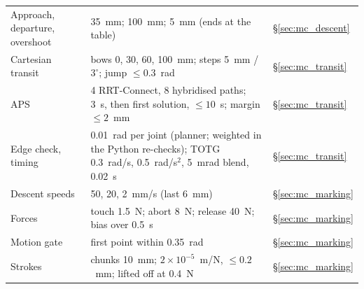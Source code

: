 {\begin{longtable}{@{}L{0.33\textwidth}L{0.47\textwidth}L{0.12\textwidth}@{}}
Approach, departure, overshoot & 35~mm; 100~mm; 5~mm (ends at the table) & \S\ref{sec:mc_descent} \\
Cartesian transit & bows 0, 30, 60, 100~mm; steps 5~mm / $3^\circ$; jump $\le0.3$~rad & \S\ref{sec:mc_transit} \\
APS & 4 RRT-Connect, 8 hybridised paths; 3~s, then first solution, $\le10$~s; margin $\le2$~mm & \S\ref{sec:mc_transit} \\
Edge check, timing & 0.01~rad per joint (planner; weighted in the Python re-checks); TOTG 0.3~rad/s, 0.5~rad/s$^2$, 5~mrad blend, 0.02~s & \S\ref{sec:mc_transit} \\
Descent speeds & 50, 20, 2~mm/s (last 6~mm) & \S\ref{sec:mc_marking} \\
Forces & touch 1.5~N; abort 8~N; release 40~N; bias over 0.5~s & \S\ref{sec:mc_marking} \\
Motion gate & first point within 0.35~rad & \S\ref{sec:mc_marking} \\
Strokes & chunks 10~mm; $2\times10^{-5}$~m/N, $\le0.2$~mm; lifted off at 0.4~N & \S\ref{sec:mc_marking} \\
\end{longtable}
}
